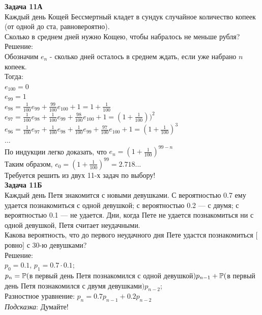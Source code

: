 \documentclass[12pt, a4paper]{article}\usepackage[]{graphicx}\usepackage[]{color}
\begin{document}
\textbf{Задача 11А} \\
Каждый день Кощей Бессмертный кладет в сундук случайное количество
копеек (от одной до ста, равновероятно). \\
Сколько в среднем дней нужно Кощею, чтобы набралось не меньше рубля? \\
Решение: \\
Обозначим $e_{n}$ - сколько дней осталось в среднем ждать, если
уже набрано $n$ копеек. \\
Тогда: \\
$e_{100}=0$ \\
$e_{99}=1$ \\
$e_{98}=\frac{1}{100}e_{99}+\frac{99}{100}e_{100}+1=1+\frac{1}{100}$\\
$e_{97}=\frac{1}{100}e_{98}+\frac{1}{100}e_{99}+\frac{98}{100}e_{100}+1=(1+\frac{1}{100}))^{2}$
\\
$e_{96}=\frac{1}{100}e_{97}+\frac{1}{100}e_{98}+\frac{1}{100}e_{99}+\frac{97}{100}e_{100}+1=(1+\frac{1}{100})^{3}$
\\
... \\
По индукции легко доказать, что $e_{n}=(1+\frac{1}{100})^{99-n}$ \\
Таким образом, $e_{0}=(1+\frac{1}{100})^{99}=2.718...$ \\

Требуется решить \textbf{} из двух 11-х задач по
выбору! \\



\textbf{Задача 11Б} \\
Каждый день Петя знакомится с новыми девушками. С вероятностью 0.7
ему удается познакомиться с одной девушкой; с вероятностью 0.2 — с
двумя; с вероятностью 0.1 — не удается. Дни, когда Пете не удается
познакомиться ни с одной девушкой, Петя считает неудачными. \\
Какова вероятность, что до первого неудачного дня Пете удастся
познакомиться $[$ровно$]$ с 30-ю девушками? \\
Решение: \\
$p_{0}=0.1$, $p_{1}=0.7\cdot 0.1$; \\
$p_{n}=\P($в первый день Петя познакомился с одной
девушкой$)p_{n-1}+\P($в первый день Петя познакомился с двумя
девушками$)p_{n-2}$; \\
Разностное уравнение: $p_{n}=0.7p_{n-1}+0.2p_{n-2}$ \\


\emph{Подсказка}: Думайте! \\
\end{document}
